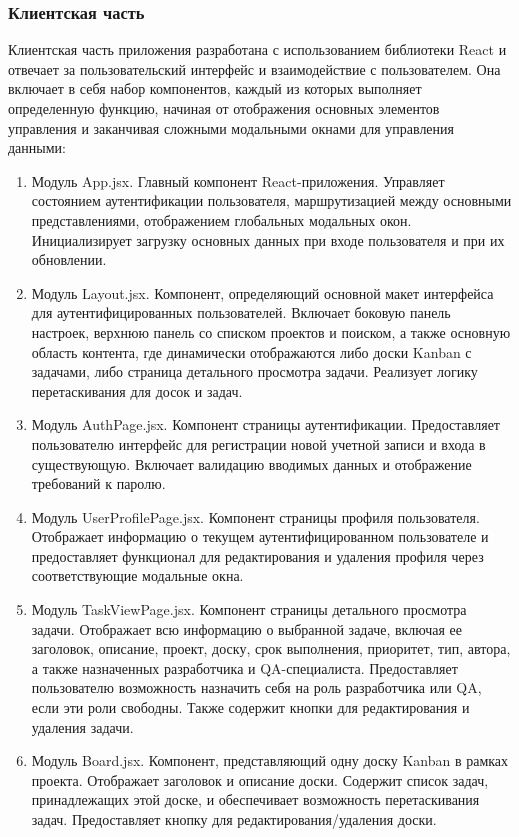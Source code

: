 \subsubsection{Клиентская часть}
Клиентская часть приложения разработана с использованием библиотеки React и отвечает за пользовательский интерфейс и взаимодействие с пользователем. Она включает в себя набор компонентов, каждый из которых выполняет определенную функцию, начиная от отображения основных элементов управления и заканчивая сложными модальными окнами для управления данными:
\begin{enumerate}
	\item Модуль App.jsx. Главный компонент React-приложения. Управляет состоянием аутентификации пользователя, маршрутизацией между основными представлениями, отображением глобальных модальных окон. Инициализирует загрузку основных данных при входе пользователя и при их обновлении.
	\item Модуль Layout.jsx. Компонент, определяющий основной макет интерфейса для аутентифицированных пользователей. Включает боковую панель настроек, верхнюю панель со списком проектов и поиском, а также основную область контента, где динамически отображаются либо доски Kanban с задачами, либо страница детального просмотра задачи. Реализует логику перетаскивания для досок и задач.
	\item Модуль AuthPage.jsx. Компонент страницы аутентификации. Предоставляет пользователю интерфейс для регистрации новой учетной записи и входа в существующую. Включает валидацию вводимых данных и отображение требований к паролю.
	\item Модуль UserProfilePage.jsx. Компонент страницы профиля пользователя. Отображает информацию о текущем аутентифицированном пользователе и предоставляет функционал для редактирования и удаления профиля через соответствующие модальные окна.
	\item Модуль TaskViewPage.jsx. Компонент страницы детального просмотра задачи. Отображает всю информацию о выбранной задаче, включая ее заголовок, описание, проект, доску, срок выполнения, приоритет, тип, автора, а также назначенных разработчика и QA-специалиста. Предоставляет пользователю возможность назначить себя на роль разработчика или QA, если эти роли свободны. Также содержит кнопки для редактирования и удаления задачи.
	\item Модуль Board.jsx. Компонент, представляющий одну доску Kanban в рамках проекта. Отображает заголовок и описание доски. Содержит список задач, принадлежащих этой доске, и обеспечивает возможность перетаскивания задач. Предоставляет кнопку для редактирования/удаления доски.

\end{enumerate}
